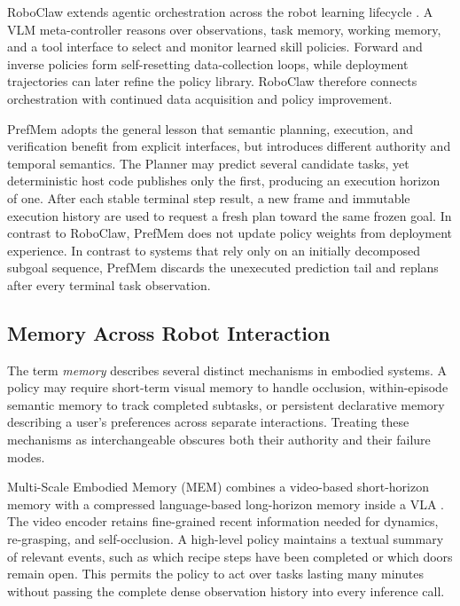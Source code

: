 \documentclass{article}
\begin{document}
RoboClaw extends agentic orchestration across the robot learning lifecycle
\parencite{li2026roboclaw}. A VLM meta-controller reasons over observations,
task memory, working memory, and a tool interface to select and monitor learned
skill policies. Forward and inverse policies form self-resetting data-collection
loops, while deployment trajectories can later refine the policy library.
RoboClaw therefore connects orchestration with continued data acquisition and
policy improvement.

PrefMem adopts the general lesson that semantic planning, execution, and
verification benefit from explicit interfaces, but introduces different
authority and temporal semantics. The Planner may predict several candidate
tasks, yet deterministic host code publishes only the first, producing an
execution horizon of one. After each stable terminal step result, a new frame
and immutable execution history are used to request a fresh plan toward the
same frozen goal. In contrast to RoboClaw, PrefMem does not update policy
weights from deployment experience. In contrast to systems that rely only on
an initially decomposed subgoal sequence, PrefMem discards the unexecuted
prediction tail and replans after every terminal task observation.

\subsection{Memory Across Robot Interaction}
\label{subsec:related-memory}

The term \emph{memory} describes several distinct mechanisms in embodied
systems. A policy may require short-term visual memory to handle occlusion,
within-episode semantic memory to track completed subtasks, or persistent
declarative memory describing a user's preferences across separate
interactions. Treating these mechanisms as interchangeable obscures both their
authority and their failure modes.

Multi-Scale Embodied Memory (MEM) combines a video-based short-horizon memory
with a compressed language-based long-horizon memory inside a VLA
\parencite{torne2026mem}. The video encoder retains fine-grained recent
information needed for dynamics, re-grasping, and self-occlusion. A high-level
policy maintains a textual summary of relevant events, such as which recipe
steps have been completed or which doors remain open. This permits the policy
to act over tasks lasting many minutes without passing the complete dense
observation history into every inference call.
\end{document}
